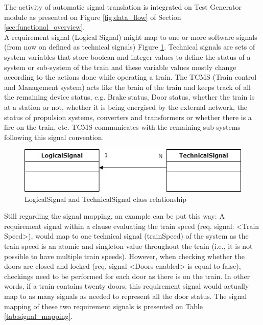The activity of automatic signal translation is integrated on Test Generator module as presented on Figure \ref{fig:data_flow} of Section \ref{sec:functional_overview}.\\
A requirement signal (Logical Signal) might map to one or more software signals (from now on defined as technical signals) Figure \ref{fig:logical_technical_signal}. Technical signals are sets of system variables that store boolean and integer values to define the status of a system or sub-system of the train and these variable values mostly change according to the actions done while operating a train. The TCMS (Train control and Management system) acts like the brain of the train and keeps track of all the remaining device status, e.g. Brake status, Door status, whether the train is at a station or not, whether it is being energised by the external network, the status of propulsion systems, converters and transformers or whether there is a fire on the train, etc. TCMS communicates with the remaining sub-systems following this signal convention.\\

\begin{figure}[h]
    \centering
    \includegraphics[scale=0.625]{images/class_diag_logical_technical_signal.jpg}
    \caption{LogicalSignal and TechnicalSignal class relationship}
    \label{fig:logical_technical_signal}
\end{figure}


Still regarding the signal mapping, an example can be put this way: A requirement signal within a clause evaluating the train speed (req. signal: <Train Speed>), would map to one technical signal (trainSpeed) of the system as the train speed is an atomic and singleton value throughout the train (i.e., it is not possible to have multiple train speeds). However, when checking whether the doors are closed and locked (req. signal <Doors enabled> is equal to false), checkings need to be performed for each door as there is on the train. In other words, if a train contains twenty doors, this requirement signal would actually map to as many signals as needed to represent all the door status. The signal mapping of these two requirement signals is presented on Table \ref{tab:signal_mapping}.

